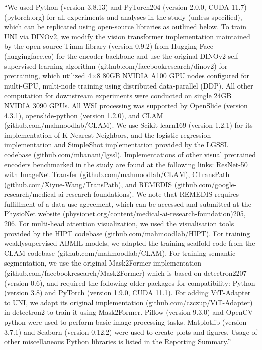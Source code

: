 \documentclass{article}%
\begin{document}
“We used Python (version 3.8.13) and PyTorch204 (version 2.0.0, CUDA 11.7) (pytorch.org) for all experiments and analyses in the study (unless specified), which can be replicated using open{-}source libraries as outlined below. To train UNI via DINOv2, we modify the vision transformer implementation maintained by the open{-}source Timm library (version 0.9.2) from Hugging Face (huggingface.co) for the encoder backbone and use the original DINOv2 self{-}supervised learning algorithm (github.com/facebookresearch/dinov2) for pretraining, which utilized 4×8 80GB NVIDIA A100 GPU nodes configured for multi{-}GPU, multi{-}node training using distributed data{-}parallel (DDP). All other computation for downstream experiments were conducted on single 24GB NVIDIA 3090 GPUs. All WSI processing was supported by OpenSlide (version 4.3.1), openslide{-}python (version 1.2.0), and CLAM (github.com/mahmoodlab/CLAM). We use Scikit{-}learn169 (version 1.2.1) for its implementation of K{-}Nearest Neighbors, and the logistic regression implementation and SimpleShot implementation provided by the LGSSL codebase (github.com/mbanani/lgssl). Implementations of other visual pretrained encoders benchmarked in the study are found at the following links: ResNet{-}50 with ImageNet Transfer (github.com/mahmoodlab/CLAM), CTransPath (github.com/Xiyue{-}Wang/TransPath), and REMEDIS (github.com/google{-}research/medical{-}ai{-}research{-}foundations). We note that REMEDIS requires fulfillment of a data use agreement, which can be accessed and submitted at the PhysioNet website (physionet.org/content/medical{-}ai{-}research{-}foundation)205, 206. For multi{-}head attention visualization, we used the visualisation tools provided by the HIPT codebase (github.com/mahmoodlab/HIPT). For training weaklysupervised ABMIL models, we adapted the training scaffold code from the CLAM codebase (github.com/mahmoodlab/CLAM). For training semantic segmentation, we use the original Mask2Former implementation (github.com/facebookresearch/Mask2Former) which is based on detectron2207 (version 0.6), and required the following older packages for compatibility: Python (version 3.8) and PyTorch (version 1.9.0, CUDA 11.1). For adding ViT{-}Adapter to UNI, we adapt its original implementation (github.com/czczup/ViT{-}Adapter) in detectron2 to train it using Mask2Former. Pillow (version 9.3.0) and OpenCV{-}python were used to perform basic image processing tasks. Matplotlib (version 3.7.1) and Seaborn (version 0.12.2) were used to create plots and figures. Usage of other miscellaneous Python libraries is listed in the Reporting Summary.”%
\end{document}
